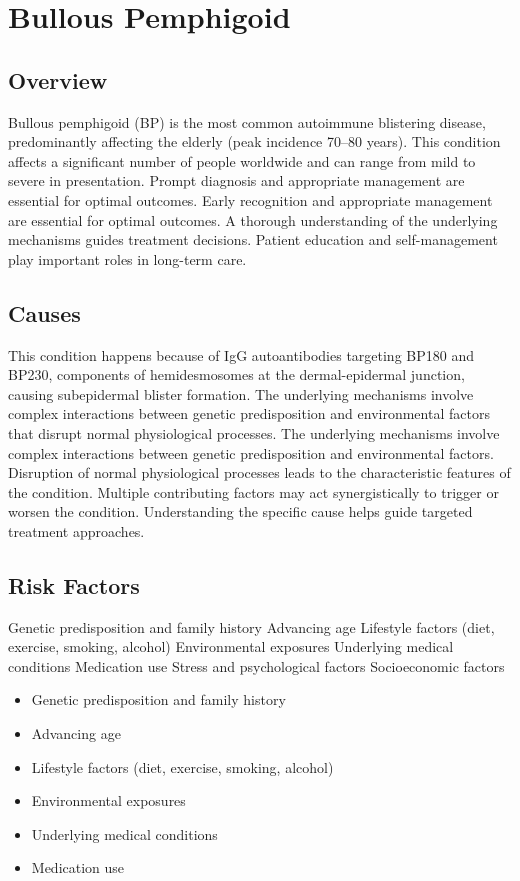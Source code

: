 \chapter{Bullous Pemphigoid}
\label{sec:Bullous Pemphigoid}

\section{Overview}
Bullous pemphigoid (BP) is the most common autoimmune blistering disease, predominantly affecting the elderly (peak incidence 70--80 years). This condition affects a significant number of people worldwide and can range from mild to severe in presentation. Prompt diagnosis and appropriate management are essential for optimal outcomes. Early recognition and appropriate management are essential for optimal outcomes. A thorough understanding of the underlying mechanisms guides treatment decisions. Patient education and self-management play important roles in long-term care.
\section{Causes}
This condition happens because of IgG autoantibodies targeting BP180 and BP230, components of hemidesmosomes at the dermal-epidermal junction, causing subepidermal blister formation. The underlying mechanisms involve complex interactions between genetic predisposition and environmental factors that disrupt normal physiological processes. The underlying mechanisms involve complex interactions between genetic predisposition and environmental factors. Disruption of normal physiological processes leads to the characteristic features of the condition. Multiple contributing factors may act synergistically to trigger or worsen the condition. Understanding the specific cause helps guide targeted treatment approaches.
\section{Risk Factors}
Genetic predisposition and family history Advancing age Lifestyle factors (diet, exercise, smoking, alcohol) Environmental exposures Underlying medical conditions Medication use Stress and psychological factors Socioeconomic factors

\begin{itemize}[noitemsep]
  \item Genetic predisposition and family history
  \item Advancing age
  \item Lifestyle factors (diet, exercise, smoking, alcohol)
  \item Environmental exposures
  \item Underlying medical conditions
  \item Medication use
\end{itemize}
